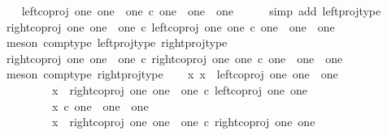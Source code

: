 \begin{isabellebody}
\ \ \isamarkupfalse%
\ {\isachardoublequoteopen}left{\isacharunderscore}{\kern0pt}coproj\ one\ {\isacharparenleft}{\kern0pt}one\ {\isasymCoprod}\ one{\isacharparenright}{\kern0pt}\ {\isasymin}\isactrlsub c\ one\ {\isasymCoprod}\ one\ {\isasymCoprod}\ one{\isachardoublequoteclose}\isanewline
\ \ \ \ \isamarkupfalse%
\ {\isacharparenleft}{\kern0pt}simp\ add{\isacharcolon}{\kern0pt}\ left{\isacharunderscore}{\kern0pt}proj{\isacharunderscore}{\kern0pt}type{\isacharparenright}{\kern0pt}\isanewline
\ \ \isamarkupfalse%
\ {\isachardoublequoteopen}right{\isacharunderscore}{\kern0pt}coproj\ one\ {\isacharparenleft}{\kern0pt}one\ {\isasymCoprod}\ one{\isacharparenright}{\kern0pt}\ {\isasymcirc}\isactrlsub c\ left{\isacharunderscore}{\kern0pt}coproj\ one\ one\ {\isasymin}\isactrlsub c\ one\ {\isasymCoprod}\ one\ {\isasymCoprod}\ one{\isachardoublequoteclose}\isanewline
\ \ \ \ \isamarkupfalse%
\ {\isacharparenleft}{\kern0pt}meson\ comp{\isacharunderscore}{\kern0pt}type\ left{\isacharunderscore}{\kern0pt}proj{\isacharunderscore}{\kern0pt}type\ right{\isacharunderscore}{\kern0pt}proj{\isacharunderscore}{\kern0pt}type{\isacharparenright}{\kern0pt}\isanewline
\ \ \isamarkupfalse%
\ {\isachardoublequoteopen}right{\isacharunderscore}{\kern0pt}coproj\ one\ {\isacharparenleft}{\kern0pt}one\ {\isasymCoprod}\ one{\isacharparenright}{\kern0pt}\ {\isasymcirc}\isactrlsub c\ right{\isacharunderscore}{\kern0pt}coproj\ one\ one\ {\isasymin}\isactrlsub c\ one\ {\isasymCoprod}\ one\ {\isasymCoprod}\ one{\isachardoublequoteclose}\isanewline
\ \ \ \ \isamarkupfalse%
\ {\isacharparenleft}{\kern0pt}meson\ comp{\isacharunderscore}{\kern0pt}type\ right{\isacharunderscore}{\kern0pt}proj{\isacharunderscore}{\kern0pt}type{\isacharparenright}{\kern0pt}\isanewline
\ \ \isamarkupfalse%
\ {\isachardoublequoteopen}{\isasymAnd}x{\isachardot}{\kern0pt}\ x\ {\isasymnoteq}\ left{\isacharunderscore}{\kern0pt}coproj\ one\ {\isacharparenleft}{\kern0pt}one\ {\isasymCoprod}\ one{\isacharparenright}{\kern0pt}\ {\isasymLongrightarrow}\isanewline
\ \ \ \ \ \ \ \ \ x\ {\isasymnoteq}\ right{\isacharunderscore}{\kern0pt}coproj\ one\ {\isacharparenleft}{\kern0pt}one\ {\isasymCoprod}\ one{\isacharparenright}{\kern0pt}\ {\isasymcirc}\isactrlsub c\ left{\isacharunderscore}{\kern0pt}coproj\ one\ one\ {\isasymLongrightarrow}\isanewline
\ \ \ \ \ \ \ \ \ x\ {\isasymin}\isactrlsub c\ one\ {\isasymCoprod}\ one\ {\isasymCoprod}\ one\ {\isasymLongrightarrow}\isanewline
\ \ \ \ \ \ \ \ \ x\ {\isacharequal}{\kern0pt}\ right{\isacharunderscore}{\kern0pt}coproj\ one\ {\isacharparenleft}{\kern0pt}one\ {\isasymCoprod}\ one{\isacharparenright}{\kern0pt}\ {\isasymcirc}\isactrlsub c\ right{\isacharunderscore}{\kern0pt}coproj\ one\ one{\isachardoublequoteclose}\isanewline

\end{isabellebody}
